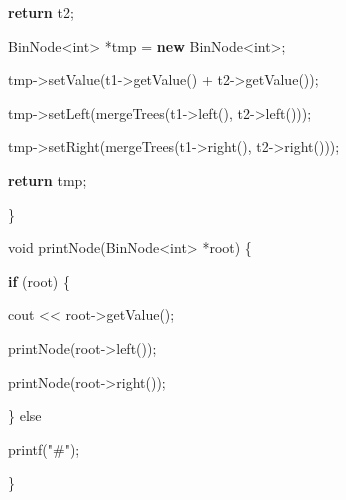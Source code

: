 \documentclass[
]{article}
\newenvironment{Shaded}{}{}
\newcommand{\ControlFlowTok}[1]{\textcolor[rgb]{0.00,0.44,0.13}{\textbf{#1}}}
\newcommand{\DataTypeTok}[1]{\textcolor[rgb]{0.56,0.13,0.00}{#1}}
\newcommand{\KeywordTok}[1]{\textcolor[rgb]{0.00,0.44,0.13}{\textbf{#1}}}
\newcommand{\NormalTok}[1]{#1}
\newcommand{\OperatorTok}[1]{\textcolor[rgb]{0.40,0.40,0.40}{#1}}
\newcommand{\StringTok}[1]{\textcolor[rgb]{0.25,0.44,0.63}{#1}}
\begin{document}
\begin{Shaded}
\begin{Highlighting}[]
		\ControlFlowTok{return}\NormalTok{ t2}\OperatorTok{;}

\NormalTok{	BinNode}\OperatorTok{\textless{}}\DataTypeTok{int}\OperatorTok{\textgreater{}} \OperatorTok{*}\NormalTok{tmp }\OperatorTok{=} \KeywordTok{new}\NormalTok{ BinNode}\OperatorTok{\textless{}}\DataTypeTok{int}\OperatorTok{\textgreater{};}

\NormalTok{	tmp}\OperatorTok{{-}\textgreater{}}\NormalTok{setValue}\OperatorTok{(}\NormalTok{t1}\OperatorTok{{-}\textgreater{}}\NormalTok{getValue}\OperatorTok{()} \OperatorTok{+}\NormalTok{ t2}\OperatorTok{{-}\textgreater{}}\NormalTok{getValue}\OperatorTok{());}

\NormalTok{	tmp}\OperatorTok{{-}\textgreater{}}\NormalTok{setLeft}\OperatorTok{(}\NormalTok{mergeTrees}\OperatorTok{(}\NormalTok{t1}\OperatorTok{{-}\textgreater{}}\NormalTok{left}\OperatorTok{(),}\NormalTok{ t2}\OperatorTok{{-}\textgreater{}}\NormalTok{left}\OperatorTok{()));}

\NormalTok{	tmp}\OperatorTok{{-}\textgreater{}}\NormalTok{setRight}\OperatorTok{(}\NormalTok{mergeTrees}\OperatorTok{(}\NormalTok{t1}\OperatorTok{{-}\textgreater{}}\NormalTok{right}\OperatorTok{(),}\NormalTok{ t2}\OperatorTok{{-}\textgreater{}}\NormalTok{right}\OperatorTok{()));}

	\ControlFlowTok{return}\NormalTok{ tmp}\OperatorTok{;}

\OperatorTok{\}}



\DataTypeTok{void}\NormalTok{ printNode}\OperatorTok{(}\NormalTok{BinNode}\OperatorTok{\textless{}}\DataTypeTok{int}\OperatorTok{\textgreater{}} \OperatorTok{*}\NormalTok{root}\OperatorTok{)} \OperatorTok{\{}

	\ControlFlowTok{if} \OperatorTok{(}\NormalTok{root}\OperatorTok{)} \OperatorTok{\{}

\NormalTok{		cout }\OperatorTok{\textless{}\textless{}}\NormalTok{ root}\OperatorTok{{-}\textgreater{}}\NormalTok{getValue}\OperatorTok{();}

\NormalTok{		printNode}\OperatorTok{(}\NormalTok{root}\OperatorTok{{-}\textgreater{}}\NormalTok{left}\OperatorTok{());}

\NormalTok{		printNode}\OperatorTok{(}\NormalTok{root}\OperatorTok{{-}\textgreater{}}\NormalTok{right}\OperatorTok{());}

	\OperatorTok{\}}\NormalTok{ else
}
\NormalTok{		printf}\OperatorTok{(}\StringTok{"\#"}\OperatorTok{);}

\OperatorTok{\}}
\end{Highlighting}
\end{Shaded}
\end{document}
